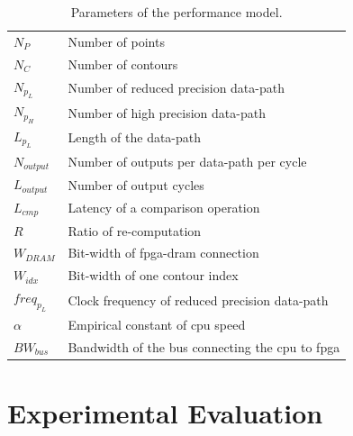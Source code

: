 \begin{table}[t!]
	\begin{spacing}{1.0}
	\caption{Parameters of the performance model.}
	\label{tab:model}
	\centering
	\smallskip
	\begin{tabular}{l|l}
			\hline
			$N_P$			& Number of points \\
			$N_C$			& Number of contours \\
			$N_{p_L}$ 		& Number of reduced precision data-path \\
			$N_{p_H}$ 		& Number of high precision data-path \\
			$L_{p_L}$			& Length of the data-path \\
			$N_{output}$ 	& Number of outputs per data-path per cycle \\
			$L_{output}$ 	& Number of output cycles \\
			$L_{cmp}$			& Latency of a comparison operation \\
			$R$ 			& Ratio of re-computation \\
			$W_{DRAM}$ 		& Bit-width of \gls{fpga}-\gls{dram} connection \\
			$W_{idx}$ 		& Bit-width of one contour index \\
			$freq_{p_L}$  	& Clock frequency of reduced precision data-path \\
			$\alpha$ 		& Empirical constant of \gls{cpu} speed \\
			$BW_{bus}$ 	& Bandwidth of the bus connecting the \gls{cpu} to \gls{fpga} \\
			\hline
		\end{tabular}
	\end{spacing}
\end{table}

%


\section{Experimental Evaluation}
\label{sec:precision_evaluation}


